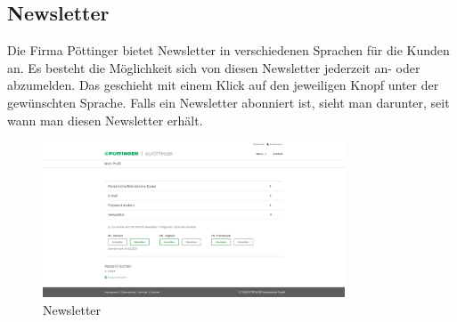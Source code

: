 \subsection{Newsletter}
Die Firma Pöttinger bietet Newsletter in verschiedenen Sprachen für die Kunden an. Es besteht die Möglichkeit sich von diesen Newsletter jederzeit an- oder abzumelden. Das geschieht mit einem Klick auf den jeweiligen Knopf unter der gewünschten Sprache. Falls ein Newsletter abonniert ist, sieht man darunter, seit wann man diesen Newsletter erhält.
\begin{figure}[H]
	\centerline{
		\includegraphics[width=0.8\textwidth]{./grafiken/erm_profil_newsletter.png}
	}
	\vskip0pt
	\caption{Newsletter} \label{fig:newsletter}
\end{figure}

